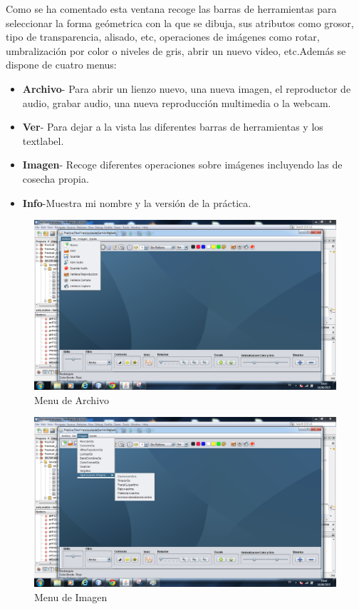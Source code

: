 Como se ha comentado esta ventana recoge las barras de herramientas para seleccionar la forma geómetrica con la que se dibuja, sus atributos como grosor, tipo de transparencia, alisado, etc, operaciones de imágenes como rotar, umbralización por color o niveles de gris, abrir un nuevo video, etc.Además se dispone de cuatro menus:
\begin{itemize}
\item \textbf{Archivo}- Para abrir un lienzo nuevo, una nueva imagen, el reproductor de audio, grabar audio, una nueva reproducción multimedia o la webcam.
\item  \textbf{Ver}- Para dejar a la vista las diferentes barras de herramientas y los textlabel.
\item \textbf{Imagen}- Recoge diferentes operaciones sobre imágenes incluyendo las de cosecha propia.
\item \textbf{Info}-Muestra mi nombre y la versión de la práctica.
\end{itemize} 
\begin{figure}[H]
  \centering
    \includegraphics[scale=0.40]{images/menuarchivo}
  \caption{Menu de Archivo}
  \label{Menu de Archivo}
\end{figure}
\begin{figure}[H]
  \centering
    \includegraphics[scale=0.40]{images/menuimagen}
  \caption{Menu de Imagen}
  \label{Menu de Imagen}
\end{figure}

